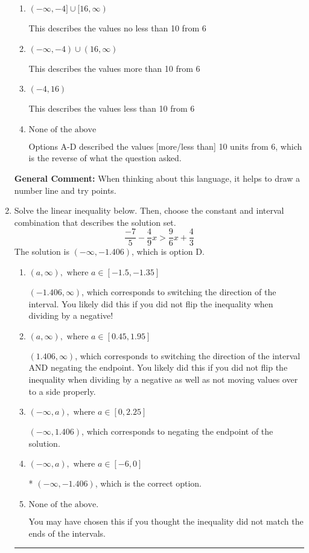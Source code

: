\documentclass{extbook}[14pt]
\newcommand{\litem}[1]{\item #1

\rule{\textwidth}{0.4pt}}
\begin{document}
\begin{enumerate}
{\begin{enumerate}[label=\Alph*.]
This describes the values no more than 10 from 6
\item \( (-\infty, -4] \cup [16, \infty) \)

This describes the values no less than 10 from 6
\item \( (-\infty, -4) \cup (16, \infty) \)

This describes the values more than 10 from 6
\item \( (-4, 16) \)

This describes the values less than 10 from 6
\item \( \text{None of the above} \)

Options A-D described the values [more/less than] 10 units from 6, which is the reverse of what the question asked.
\end{enumerate}

\textbf{General Comment:} When thinking about this language, it helps to draw a number line and try points.
}
\litem{
Solve the linear inequality below. Then, choose the constant and interval combination that describes the solution set.
\[ \frac{-7}{5} - \frac{4}{9} x > \frac{9}{6} x + \frac{4}{3} \]The solution is \( (-\infty, -1.406) \), which is option D.\begin{enumerate}[label=\Alph*.]
\item \( (a, \infty), \text{ where } a \in [-1.5, -1.35] \)

 $(-1.406, \infty)$, which corresponds to switching the direction of the interval. You likely did this if you did not flip the inequality when dividing by a negative!
\item \( (a, \infty), \text{ where } a \in [0.45, 1.95] \)

 $(1.406, \infty)$, which corresponds to switching the direction of the interval AND negating the endpoint. You likely did this if you did not flip the inequality when dividing by a negative as well as not moving values over to a side properly.
\item \( (-\infty, a), \text{ where } a \in [0, 2.25] \)

 $(-\infty, 1.406)$, which corresponds to negating the endpoint of the solution.
\item \( (-\infty, a), \text{ where } a \in [-6, 0] \)

* $(-\infty, -1.406)$, which is the correct option.
\item \( \text{None of the above}. \)

You may have chosen this if you thought the inequality did not match the ends of the intervals.
\end{enumerate}

}
\end{enumerate}
\end{document}
